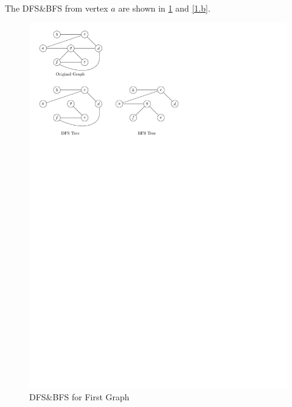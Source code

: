 \begin{homeworkProblem}

\begin{homeworkSubProblem}
    The DFS\&BFS from vertex $a$ are shown in \cref{1.a} and \cref{1.b}.

    \begin{figure}[H]
        \caption{DFS\&BFS for First Graph}\label{1.a}
        \centering
        \includegraphics[width=.8\textwidth]{running1a}
    \end{figure}


\end{homeworkSubProblem}
\end{homeworkProblem}
